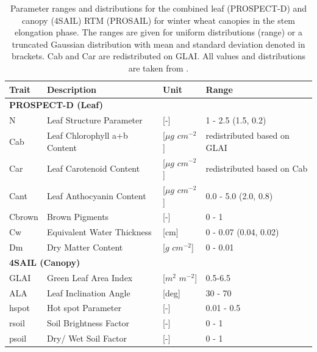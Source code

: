 \begin{table}[H]
\caption{Parameter ranges and distributions for the combined leaf (PROSPECT-D) and canopy (4SAIL) \gls{RTM} (PROSAIL) for winter wheat canopies in the stem elongation phase. The ranges are given for uniform distributions (range) or a truncated Gaussian distribution with mean and standard deviation denoted in brackets. Cab and Car are redistributed on \gls{GLAI}. All values and distributions are taken from \cite{graf_insights_2023}.}
\label{tab:drc-prosail-inputs}
\begin{tabular}{@{}lllllll@{}}
\toprule
  \textbf{Trait}     & \textbf{Description}         & \textbf{Unit}           & \multicolumn{4}{l}{\textbf{Range}}              \\ \midrule
\multicolumn{7}{l}{\textbf{PROSPECT-D (Leaf)}}                                                                \\
\midrule
N      & Leaf Structure Parameter     & {[}-{]}                 & \multicolumn{4}{l}{1 - 2.5 (1.5, 0.2)}          \\
Cab    & Leaf Chlorophyll a+b Content & {[}$\mu g$ $cm^{-2}${]} & \multicolumn{4}{l}{redistributed based on GLAI} \\
Car    & Leaf Carotenoid Content      & {[}$\mu g$ $cm^{-2}${]} & \multicolumn{4}{l}{redistributed based on Cab}  \\
Cant   & Leaf Anthocyanin Content     & {[}$\mu g$ $cm^{-2}${]} & \multicolumn{4}{l}{0.0 - 5.0 (2.0, 0.8)}        \\
Cbrown & Brown Pigments               & {[}-{]}                 & \multicolumn{4}{l}{0 - 1}                       \\
Cw     & Equivalent Water Thickness   & {[}cm{]}                & \multicolumn{4}{l}{0 - 0.07 (0.04, 0.02)}       \\
Dm     & Dry Matter Content           & {[}$g$ $cm^{-2}${]}     & \multicolumn{4}{l}{0 - 0.01}                    \\
\midrule
\multicolumn{7}{l}{\textbf{4SAIL (Canopy)}}                                                                     \\
\midrule
GLAI   & Green Leaf Area Index        & {[}$m^2$ $m^{-2}${]}    & \multicolumn{4}{l}{0.5-6.5}                         \\
ALA    & Leaf Inclination Angle       & {[}deg{]}               & \multicolumn{4}{l}{30 - 70}                     \\
hspot  & Hot spot Parameter           & {[}-{]}                 & \multicolumn{4}{l}{0.01 - 0.5}                  \\
rsoil  & Soil Brightness Factor       & {[}-{]}                 & \multicolumn{4}{l}{0 - 1}                       \\
psoil  & Dry/ Wet Soil Factor         & {[}-{]}                 & \multicolumn{4}{l}{0 - 1}                       \\ \bottomrule
\end{tabular}
\end{table}


